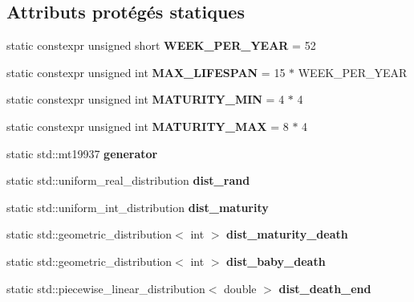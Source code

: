 \subsection*{Attributs protégés statiques}
\begin{DoxyCompactItemize}
\item 
\mbox{\label{classRabbit_a5dfc97704fe0f61d4e476bb27baa93ff}} 
static constexpr unsigned short {\bfseries W\+E\+E\+K\+\_\+\+P\+E\+R\+\_\+\+Y\+E\+AR} = 52
\item 
\mbox{\label{classRabbit_ae71738c607e344447003e92d45ab290e}} 
static constexpr unsigned int {\bfseries M\+A\+X\+\_\+\+L\+I\+F\+E\+S\+P\+AN} = 15 $\ast$ W\+E\+E\+K\+\_\+\+P\+E\+R\+\_\+\+Y\+E\+AR
\item 
\mbox{\label{classRabbit_a2e5e7f6d62f1018fcb5b6417a554d7e9}} 
static constexpr unsigned int {\bfseries M\+A\+T\+U\+R\+I\+T\+Y\+\_\+\+M\+IN} = 4 $\ast$ 4
\item 
\mbox{\label{classRabbit_abdf1b2078353109ae7421059c9eec860}} 
static constexpr unsigned int {\bfseries M\+A\+T\+U\+R\+I\+T\+Y\+\_\+\+M\+AX} = 8 $\ast$ 4
\item 
\mbox{\label{classRabbit_a85b69f5d6032b5e8ff32f3fc420df351}} 
static std\+::mt19937 {\bfseries generator}
\item 
\mbox{\label{classRabbit_abd28bc45242f07e70b6fdaaedf9165b7}} 
static std\+::uniform\+\_\+real\+\_\+distribution {\bfseries dist\+\_\+rand}
\item 
\mbox{\label{classRabbit_ad4ed491df3ea1522f6f220b16e3c3030}} 
static std\+::uniform\+\_\+int\+\_\+distribution {\bfseries dist\+\_\+maturity}
\item 
\mbox{\label{classRabbit_a091bd3287716c3c26c56595ca0e11032}} 
static std\+::geometric\+\_\+distribution$<$ int $>$ {\bfseries dist\+\_\+maturity\+\_\+death}
\item 
\mbox{\label{classRabbit_acca437a06bf05a4afe817f1ac58c3cee}} 
static std\+::geometric\+\_\+distribution$<$ int $>$ {\bfseries dist\+\_\+baby\+\_\+death}
\item 
\mbox{\label{classRabbit_a0f1cd42717f7c40b0f062c7d00752b1b}} 
static std\+::piecewise\+\_\+linear\+\_\+distribution$<$ double $>$ {\bfseries dist\+\_\+death\+\_\+end}
\end{DoxyCompactItemize}


